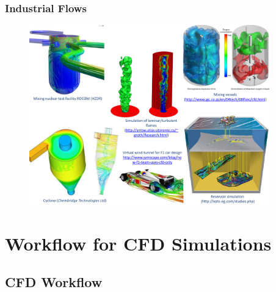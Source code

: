\documentclass[10pt,compress,handout,ignorenonframetext]{beamer}
\begin{document}
\begin{frame}
 \frametitle{Industrial Flows} 

   \begin{figure}%
    \begin{center}
     \includegraphics[width=12.cm, height=7.8cm, clip]{./Figs/IndustrialApplications.pdf}
    \end{center}
   \end{figure}    

\end{frame}


\section{Workflow for CFD Simulations}


\subsection{CFD Workflow}
 
\end{document}
